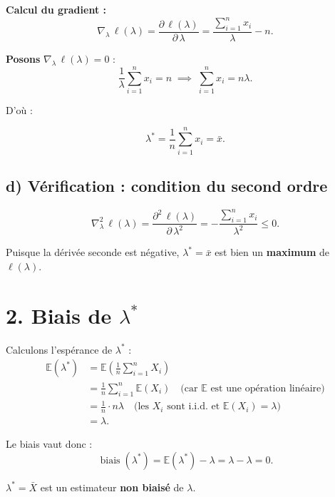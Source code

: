 \documentclass[12pt,a4paper]{article}
\begin{document}
\medskip
\textbf{Calcul du gradient :}
\[
  \nabla_{\!\lambda}\,\ell(\lambda)
  = \frac{\partial\,\ell(\lambda)}{\partial\,\lambda}
  = \frac{\displaystyle\sum_{i=1}^{n} x_i}{\lambda} - n.
\]

\medskip
\textbf{Posons} $\nabla_{\!\lambda}\,\ell(\lambda) = 0$ :
\[
  \frac{1}{\lambda}\sum_{i=1}^{n} x_i = n
  \;\implies\;
  \sum_{i=1}^{n} x_i = n\lambda.
\]

D'où :
\begin{resultbox}
\[
  \lambda^{*} = \frac{1}{n}\sum_{i=1}^{n} x_i = \bar{x}.
\]
\end{resultbox}

\subsection*{d) Vérification : condition du second ordre}

\[
  \nabla^{2}_{\!\lambda}\,\ell(\lambda)
  = \frac{\partial^{2}\,\ell(\lambda)}{\partial\,\lambda^{2}}
  = -\frac{\displaystyle\sum_{i=1}^{n} x_i}{\lambda^{2}}
  \leq 0.
\]

Puisque la dérivée seconde est négative, $\lambda^{*} = \bar{x}$ est bien
un \textbf{maximum} de $\ell(\lambda)$.

\section*{2. Biais de $\lambda^{*}$}

Calculons l'espérance de $\lambda^{*}$ :
\begin{align*}
  \mathbb{E}\!\left(\lambda^{*}\right)
  &= \mathbb{E}\!\left(\frac{1}{n}\sum_{i=1}^{n} X_i\right)\\[4pt]
  &= \frac{1}{n}\sum_{i=1}^{n} \mathbb{E}(X_i)
     \quad \text{(car $\mathbb{E}$ est une opération linéaire)}\\[4pt]
  &= \frac{1}{n} \cdot n\lambda
     \quad \text{(les $X_i$ sont i.i.d. et $\mathbb{E}(X_i) = \lambda$)}\\[4pt]
  &= \lambda.
\end{align*}

Le biais vaut donc :
\[
  \operatorname{biais}(\lambda^{*})
  = \mathbb{E}(\lambda^{*}) - \lambda
  = \lambda - \lambda
  = 0.
\]

\begin{resultbox}
$\lambda^{*} = \bar{X}$ est un estimateur \textbf{non biaisé} de $\lambda$.
\end{resultbox}
\end{document}
